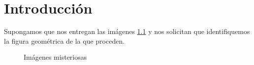 \documentclass[12pt, a4paper, twoside]{book}
\numberwithin{equation}{section}
\theoremstyle{definition}
\theoremstyle{remark}
\theoremstyle{plain}
\begin{document}
	\tableofcontents

	
	\chapter{Introducción}
	Supongamos que nos entregan las imágenes \ref{fig:mist} y nos 
	solicitan que identifiquemos la figura geométrica de la que proceden.

	\begin{figure}[!htbp]
			\begin{figure}[H]
			\end{figure}
		\endminipage
			\begin{figure}[H]
			\end{figure}
		\endminipage
		\caption{Imágenes misteriosas}
		\label{fig:mist}
	\end{figure}
\end{document}
